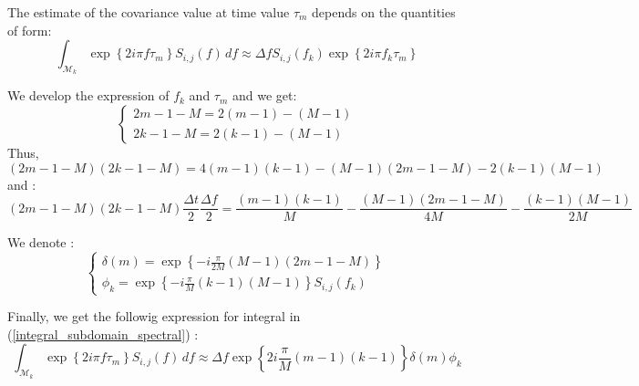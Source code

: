 The estimate of the covariance value at time value $\tau_{m}$ depends on the quantities of form:
\begin{equation}\label{integral_subdomain_spectral}
  \int_{\mathcal{M}_k}\exp\left\{  2i\pi f \tau_{m} \right\} S_{i,j}(f)\, df \approx \Delta f S_{i,j}(f_k) \exp\left\{  2i\pi f_k \tau_{m} \right\}
\end{equation}

We develop the expression of $f_k$ and $\tau_{m}$ and we get:
\begin{equation*}
  \left\{
  \begin{array}{l}
    2m - 1 - M = 2 (m-1) - (M-1) \\
    2k - 1 - M = 2 (k-1) - (M-1)
  \end{array}
  \right.
\end{equation*}
Thus,
\begin{equation*}
  (2m - 1 - M) (2k - 1 - M) = 4 (m-1)(k-1) - (M-1)(2m -1 -M) - 2 (k-1)(M-1)
\end{equation*}
and :
\begin{equation*}
  (2m - 1 - M) (2k - 1 - M)\frac{\Delta t}{2}\frac{\Delta f}{2} = \frac{(m-1)(k-1)}{M} - \frac{(M-1)(2m -1 -M)}{4M} - \frac{(k-1)(M-1)}{2M}
\end{equation*}

We denote :
\begin{equation*}
  \left\{
  \begin{array}{l}
    \delta(m) = \exp\left\{-i \frac{\pi}{2M} (M-1)(2m -1 -M) \right\}\\
    \phi_k = \exp\left\{-i \frac{\pi}{M} (k-1)(M-1) \right\} S_{i,j}(f_k)
  \end{array}
  \right.
\end{equation*}

Finally, we get the followig expression for integral in (\ref{integral_subdomain_spectral})  :
\begin{equation*}
  \int_{\mathcal{M}_k}\exp\left\{  2i\pi f \tau_{m} \right\} S_{i,j}(f)\, df \approx \Delta f \exp\left\{2i \frac{\pi}{M} (m-1)(k-1)  \right\} \delta(m) \phi_k
\end{equation*}

